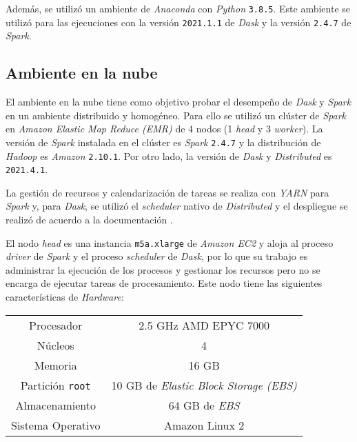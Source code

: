 Además, se utilizó un ambiente de \textit{Anaconda} con \textit{Python} \texttt{3.8.5}. Este ambiente se utilizó para las ejecuciones con la versión  \texttt{2021.1.1} de \textit{Dask} y la versión \texttt{2.4.7} de \textit{Spark}. 

\subsection{Ambiente en la nube}

El ambiente en la nube tiene como objetivo probar el desempeño de \textit{Dask} y \textit{Spark} en un ambiente distribuido y homogéneo. Para ello se utilizó un clúster de \textit{Spark} en \textit{Amazon Elastic Map Reduce (EMR)} de 4 nodos (1 \textit{head} y 3 \textit{worker}). La versión de \textit{Spark} instalada en el clúster es \textit{Spark} \texttt{2.4.7} y la distribución de \textit{Hadoop} es \textit{Amazon} \texttt{2.10.1}. Por otro lado, la versión de \textit{Dask} y \textit{Distributed} es \texttt{2021.4.1}. 


La gestión de recursos y calendarización de tareas se realiza con \textit{YARN} para \textit{Spark} y, para \textit{Dask}, se utilizó el \textit{scheduler} nativo de \textit{Distributed} y el despliegue se realizó de acuerdo a la documentación \cite{daskdistributedsetup}.

El nodo \textit{head} es una instancia \texttt{m5a.xlarge} de \textit{Amazon EC2} y aloja al proceso \textit{driver} de \textit{Spark} y el proceso \textit{scheduler} de \textit{Dask}, por lo que su trabajo es administrar la ejecución de los procesos y gestionar los recursos pero no se encarga de ejecutar tareas de procesamiento. Este nodo tiene las siguientes características de \textit{Hardware}:

\begin{center}
\begin{tabular}{|c|c|}
 \hline
  Procesador & 2.5 GHz AMD EPYC 7000 \\ 
  Núcleos & 4 \\
  Memoria & 16 GB \\ 
  Partición \texttt{root} & 10 GB de \textit{Elastic Block Storage (EBS)}  \\
  Almacenamiento & 64 GB de \textit{EBS}  \\ 
  Sistema Operativo & Amazon Linux 2 \\
  \hline
\end{tabular}
\end{center}

